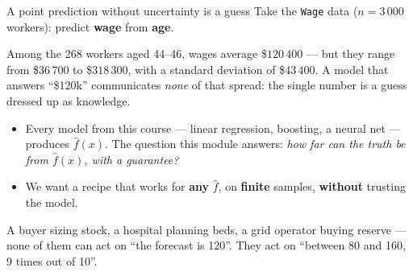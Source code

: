 \documentclass[aspectratio=169,11pt]{beamer}
\begin{document}
\begin{frame}{A point prediction without uncertainty is a guess}
  Take the \texttt{Wage} data ($n = 3\,000$ workers): predict \textbf{wage} from
  \textbf{age}.
  \begin{numexample}
    Among the 268 workers aged 44--46, wages average \$$120\,400$ --- but they range
    from \$$36\,700$ to \$$318\,300$, with a standard deviation of \$$43\,400$.
    A model that answers ``\$120k'' communicates \emph{none} of that spread: the single
    number is a guess dressed up as knowledge.
  \end{numexample}
  \begin{itemize}
    \item Every model from this course --- linear regression, boosting, a neural net ---
          produces $\hat f(x)$. The question this module answers: \emph{how far can the
          truth be from $\hat f(x)$, with a guarantee?}
    \item We want a recipe that works for \textbf{any} $\hat f$, on \textbf{finite}
          samples, \textbf{without} trusting the model.
  \end{itemize}
  \begin{industry}
    A buyer sizing stock, a hospital planning beds, a grid operator buying reserve ---
    none of them can act on ``the forecast is 120''. They act on ``between 80 and 160,
    9 times out of 10''.
  \end{industry}
\end{frame}
\end{document}
